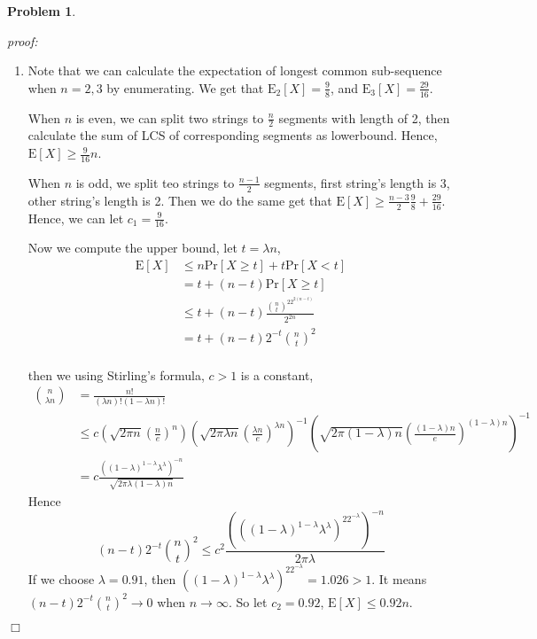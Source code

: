 \documentclass{article}
\newtheorem{problem}[theorem]{Problem}
\newenvironment{solution}{\noindent \textit{proof:}}{$\Box$}
\begin{document}
\begin{problem}
\end{problem}
\begin{solution}
    \begin{enumerate}[1.]
        \item Note that we can calculate the expectation of longest common sub-sequence when $n=2,3$ by enumerating. We get that $\mathrm{E}_2[X] = \frac 9 8$, and $\mathrm{E}_3[X]=\frac {29} {16}$.
        
        When $n$ is even, we can split two strings to $\frac n 2$ segments with length of 2, then 
        calculate the sum of LCS of corresponding segments as lowerbound. Hence, $\mathrm{E}[X] 
        \geq \frac 9 {16} n$. 
        
        When $n$ is odd, we split teo strings to $\frac {n-1} 2$ segments, first string's length is
        3, other string's length is 2. Then we do the same get that $\mathrm{E}[X] \geq \frac {n-3} {2} \frac 9 8 + \frac{29} {16}$.
        Hence, we can let $c_1 = \frac 9 {16}$.
        
        Now we compute the upper bound, let $t = \lambda n$,
        \begin{align*}
            \mathrm{E}[X] &\leq n\mathrm{Pr}[X\geq t]+t\mathrm{Pr}[X<t] \\
            &= t + (n-t)\mathrm{Pr}[X\geq t] \\
            &\leq t + (n-t)\frac {\binom{n}{t}^22^{2(n-t)}} {2^{2n}} \\
            &=t + (n-t)2^{-t}\binom{n}{t}^2 \\
        \end{align*}
        
        then we using Stirling's formula, $c>1$ is a constant,
        \begin{align*}
            \binom{n}{\lambda n} &= \frac {n!} {(\lambda n)!(1-\lambda n)!}  \\
            &\leq c
            \left( \sqrt{2\pi n} \left(\frac n e \right)^n\right)
            \left( \sqrt{2\pi\lambda n} \left(\frac {\lambda n} e \right)^{\lambda n}\right)^{-1}
            \left( \sqrt{2\pi(1-\lambda) n} \left(\frac {(1-\lambda) n} e \right)^{(1-\lambda) n}\right)^{-1} \\
            &= c \frac {((1-\lambda)^{1-\lambda}\lambda^\lambda)^{-n}} {\sqrt{2\pi\lambda(1-\lambda)n}}
        \end{align*}
        Hence
        $$
        (n-t)2^{-t}\binom{n}{t}^2 \leq 
        c^2 \frac {(((1-\lambda)^{1-\lambda}\lambda^\lambda)^22^{-\lambda})^{-n}} 
        {2\pi\lambda}
        $$
        If we choose $\lambda = 0.91$, then 
        $((1-\lambda)^{1-\lambda}\lambda^\lambda)^22^{-\lambda} = 1.026 > 1$. It means
        $(n-t)2^{-t}\binom{n}{t}^2 \rightarrow 0$ when $n \rightarrow \infty$. So let $c_2 = 0.92$,
        $\mathrm{E}[X] \leq 0.92n$.
        

\end{enumerate}
\end{solution}
\end{document}
